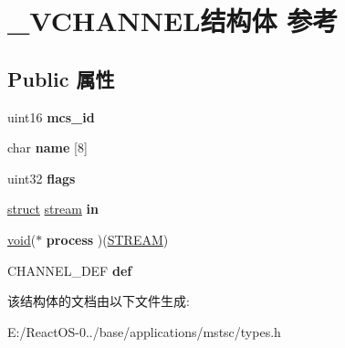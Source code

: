 \hypertarget{struct___v_c_h_a_n_n_e_l}{}\section{\+\_\+\+V\+C\+H\+A\+N\+N\+E\+L结构体 参考}
\label{struct___v_c_h_a_n_n_e_l}
\subsection*{Public 属性}
\begin{DoxyCompactItemize}
\item 
\mbox{\label{struct___v_c_h_a_n_n_e_l_aecf85af5f5f09c738c17fb25cb3e3fc2}} 
uint16 {\bfseries mcs\+\_\+id}
\item 
\mbox{\label{struct___v_c_h_a_n_n_e_l_a841ea6532fd514f47419e38d5f25ff3a}} 
char {\bfseries name} \mbox{[}8\mbox{]}
\item 
\mbox{\label{struct___v_c_h_a_n_n_e_l_a518b1fc39b15f7938db0033571dc3509}} 
uint32 {\bfseries flags}
\item 
\mbox{\label{struct___v_c_h_a_n_n_e_l_ae1534bd23a913c055cb09b542050aec6}} 
\hyperlink{interfacestruct}{struct} \hyperlink{structstream}{stream} {\bfseries in}
\item 
\mbox{\label{struct___v_c_h_a_n_n_e_l_a2474de28e7955ff26a814b993020361f}} 
\hyperlink{interfacevoid}{void}($\ast$ {\bfseries process} )(\hyperlink{structstream}{S\+T\+R\+E\+AM})
\item 
\mbox{\label{struct___v_c_h_a_n_n_e_l_a551ad70f2acc7f91aa1ab17e9eb48856}} 
C\+H\+A\+N\+N\+E\+L\+\_\+\+D\+EF {\bfseries def}
\end{DoxyCompactItemize}


该结构体的文档由以下文件生成\+:\begin{DoxyCompactItemize}
\item 
E\+:/\+React\+O\+S-\/0../base/applications/mstsc/types.\+h\end{DoxyCompactItemize}
